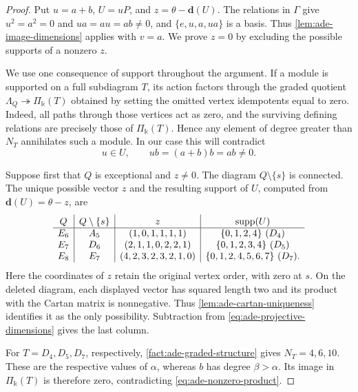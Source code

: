 \documentclass[a4paper,11pt,reqno]{amsart}
\theoremstyle{definition}
\theoremstyle{plain}
\numberwithin{equation}{section}
\newcommand{\kk}{\Bbbk}
\begin{document}
\begin{proof}
Put \(u=a+b\), \(U=uP\), and \(z=\theta-\mathbf d(U)\).
The relations in \(\Gamma\) give \(u^2=a^2=0\) and
\(ua=au=ab\ne0\), and \(\{e,u,a,ua\}\) is a basis.
Thus \cref{lem:ade-image-dimensions} applies with \(v=a\).
We prove \(z=0\) by excluding the possible supports of a nonzero
\(z\).

We use one consequence of support throughout the argument.
If a module is supported on a full subdiagram \(T\), its action
factors through the graded quotient
\(\Lambda_Q\twoheadrightarrow\Pi_\kk(T)\) obtained by setting
the omitted vertex idempotents equal to zero.  Indeed, all paths
through those vertices act as zero, and the surviving defining
relations are precisely those of \(\Pi_\kk(T)\).
Hence any element of degree greater than \(N_T\) annihilates
such a module.  In our case this will contradict
\begin{equation}
\label{eq:ade-nonzero-product}
 u\in U,\qquad ub=(a+b)b=ab\ne0.
\end{equation}

Suppose first that \(Q\) is exceptional and \(z\ne0\).
The diagram \(Q\setminus\{s\}\) is connected.
The unique possible vector \(z\) and the resulting support of
\(U\), computed from \(\mathbf d(U)=\theta-z\), are
\begin{equation}
\label{eq:ade-possible-supports}
\begin{array}{c|c|c|c}
 Q&Q\setminus\{s\}&z&\operatorname{supp}(U)\rule{0pt}{2.4ex}\\\hline
 E_6&A_5&(1,0,1,1,1,1)&\{0,1,2,4\}\ (D_4)\\
 E_7&D_6&(2,1,1,0,2,2,1)&\{0,1,2,3,4\}\ (D_5)\\
 E_8&E_7&(4,2,3,2,3,2,1,0)&\{0,1,2,4,5,6,7\}\ (D_7).
\end{array}
\end{equation}
Here the coordinates of \(z\) retain the original vertex order,
with zero at \(s\).  On the deleted diagram, each displayed vector
has squared length two and its product with the Cartan matrix is
nonnegative.  Thus \cref{lem:ade-cartan-uniqueness} identifies it
as the only possibility.  Subtraction from
\eqref{eq:ade-projective-dimensions} gives the last column.

For \(T=D_4,D_5,D_7\), respectively,
\cref{fact:ade-graded-structure} gives \(N_T=4,6,10\).
These are the respective values of \(\alpha\), whereas \(b\)
has degree \(\beta>\alpha\).
Its image in \(\Pi_\kk(T)\) is therefore zero, contradicting
\eqref{eq:ade-nonzero-product}.


\end{proof}
\end{document}
